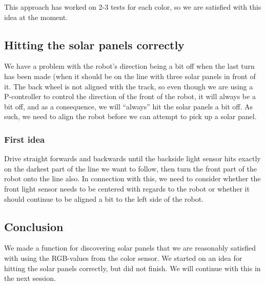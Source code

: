 This approach has worked on 2-3 tests for each color, so we are
satisfied with this idea at the moment.

\subsection{Hitting the solar panels correctly}

We have a problem with the robot's direction being a bit off when the
last turn has been made (when it should be on the line with three solar
panels in front of it. The back wheel is not aligned with the track, so
even though we are using a P-controller to control the direction of the
front of the robot, it will always be a bit off, and as a consequence,
we will ``always'' hit the solar panels a bit off. As such, we need to
align the robot before we can attempt to pick up a solar panel.

\subsubsection{First idea}

Drive straight forwards and backwards until the backside light sensor
hits exactly on the darkest part of the line we want to follow, then
turn the front part of the robot onto the line also. In connection with
this, we need to consider whether the front light sensor needs to be
centered with regards to the robot or whether it should continue to be
aligned a bit to the left side of the robot.

\subsection{Conclusion}

We made a function for discovering solar panels that we are reasonably
satisfied with using the RGB-values from the color sensor. We started on
an idea for hitting the solar panels correctly, but did not finish. We
will continue with this in the next session.
